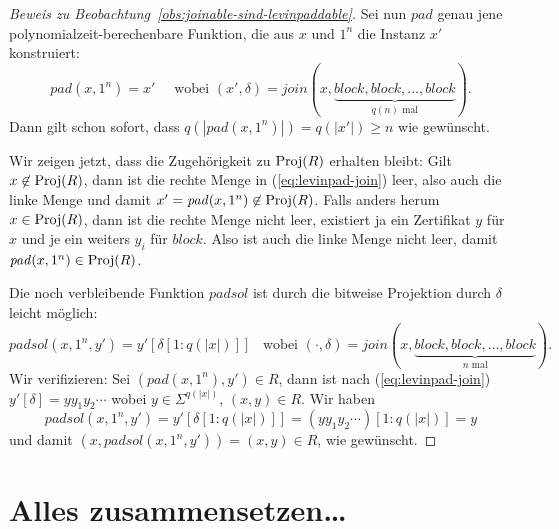 \begin{proof}[Beweis zu Beobachtung~\ref{obs:joinable-sind-levinpaddable}]
    Sei nun $\mathit{pad}$ genau jene polynomialzeit-berechenbare Funktion, die aus $x$ und $1^n$ die Instanz $x'$ konstruiert:
    \[ \mathit{pad}(x, 1^n) = x' \quad\text{ wobei }
    (x',\delta)=\mathit{join}(x, \underbrace{\mathit{block}, \mathit{block}, \ldots, \mathit{block}}_{\text{$q(n)$ mal}}).\]
    Dann gilt schon sofort, dass $q(|\mathit{pad}(x, 1^n)|)=q(|x'|)\geq n$ wie gewünscht.

    Wir zeigen jetzt, dass die Zugehörigkeit zu $\operatorname{Proj}(R)$ erhalten bleibt:
    Gilt $x\not\in\operatorname{Proj}(R)$, dann ist die rechte Menge in (\ref{eq:levinpad-join}) leer, also auch die linke Menge und damit $x'=\mathit{pad}(x, 1^n)\not\in \operatorname{Proj}(R)$.
    Falls anders herum $x\in\operatorname{Proj}(R)$, dann ist die rechte Menge nicht leer, existiert ja ein Zertifikat $y$ für $x$ und je ein weiters $y_i$ für $\mathit{block}$. Also ist auch die linke Menge nicht leer, damit $\mathit{pad}(x, 1^n)\in \operatorname{Proj}(R)$.

    Die noch verbleibende Funktion $\mathit{padsol}$ ist durch die bitweise Projektion durch $\delta$ leicht möglich:
    \[
        \mathit{padsol}(x, 1^n, y') = y'[\delta[1:q(|x|)]] \enspace\text{ wobei } (\cdot, \delta) = \mathit{join}(x, \underbrace{\mathit{block}, \mathit{block}, \ldots, \mathit{block}}_{\text{$n$ mal}}).\]
    Wir verifizieren: Sei $(\mathit{pad}(x, 1^n), y')\in R$, dann ist nach (\ref{eq:levinpad-join}) $y'[\delta]=yy_1y_2\cdots$ wobei $y\in\Sigma^{q(|x|)}$, $(x, y)\in R$. 
    Wir haben
    \[ \mathit{padsol}(x, 1^n, y') = y'[\delta[1:q(|x|)]] = (yy_1y_2\cdots)[1:q(|x|)] = y \]
    und damit $(x, \mathit{padsol}(x, 1^n, y')) = (x, y)\in R$, wie gewünscht.
\end{proof}

\section{Alles zusammensetzen\ldots}

